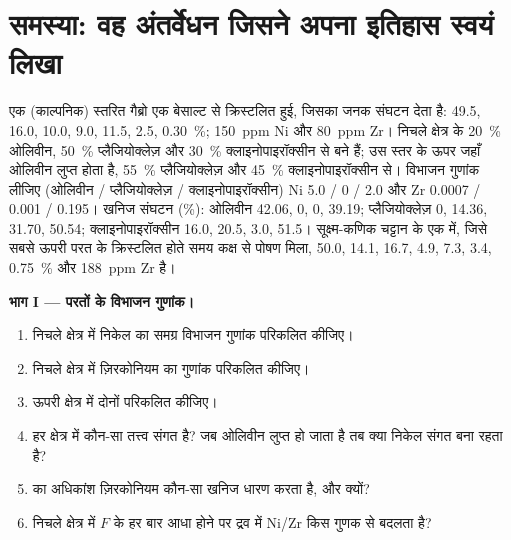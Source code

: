 \section{समस्या: वह अंतर्वेधन जिसने अपना इतिहास स्वयं लिखा}

\begin{problem}
\label{pb:b2:magmatic-differentiation:1}
एक (काल्पनिक) स्तरित गैब्रो  एक बेसाल्ट से क्रिस्टलित हुई, जिसका 
जनक संघटन देता है:  49.5,  16.0,  10.0,
 9.0,  11.5,  2.5,  \qty{0.30}{\percent};
\qty{150}{ppm} Ni और \qty{80}{ppm} Zr। निचले क्षेत्र के 
\qty{20}{\percent} ओलिवीन, \qty{50}{\percent} प्लैजियोक्लेज़ और \qty{30}{\percent}
क्लाइनोपाइरॉक्सीन से बने हैं; उस स्तर के ऊपर जहाँ ओलिवीन लुप्त होता है,
\qty{55}{\percent} प्लैजियोक्लेज़ और \qty{45}{\percent} क्लाइनोपाइरॉक्सीन से। विभाजन गुणांक लीजिए
(ओलिवीन / प्लैजियोक्लेज़ / क्लाइनोपाइरॉक्सीन) Ni 5.0 / 0 / 2.0 और Zr 0.0007 / 0.001 /
0.195। खनिज संघटन (\unit{\percent}): ओलिवीन  42.06,  0,
 0,  39.19; प्लैजियोक्लेज़ 0, 14.36, 31.70, 50.54; क्लाइनोपाइरॉक्सीन
16.0, 20.5, 3.0, 51.5। सूक्ष्म-कणिक चट्टान के एक  में, जिसे सबसे ऊपरी परत के
क्रिस्टलित होते समय कक्ष से पोषण मिला,
 50.0,  14.1,  16.7,  4.9,  7.3,
 3.4,  \qty{0.75}{\percent} और \qty{188}{ppm} Zr है।

\noindent\textbf{भाग I --- परतों के विभाजन गुणांक।}
\begin{enumerate}
\item निचले क्षेत्र में निकेल का समग्र विभाजन गुणांक परिकलित कीजिए।
\item निचले क्षेत्र में ज़िरकोनियम का गुणांक परिकलित कीजिए।
\item ऊपरी क्षेत्र में दोनों परिकलित कीजिए।
\item हर क्षेत्र में कौन-सा तत्त्व संगत है? जब ओलिवीन लुप्त हो जाता है तब क्या निकेल
संगत बना रहता है?
\item {} का अधिकांश ज़िरकोनियम कौन-सा खनिज धारण करता है, और क्यों?
\item निचले क्षेत्र में $F$ के हर बार आधा होने पर द्रव में Ni/Zr किस गुणक से
बदलता है?
\end{enumerate}


\end{problem}

